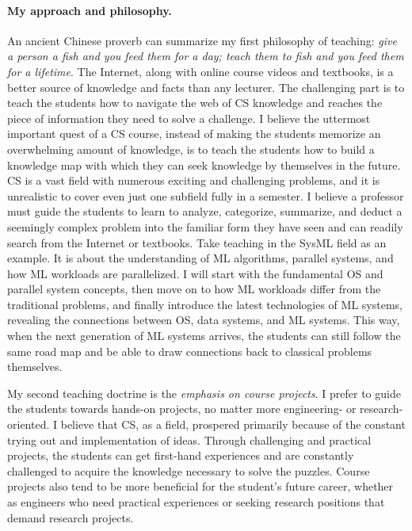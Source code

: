 \documentclass[letterpaper]{article}
\begin{document}
\paragraph{My approach and philosophy.} An ancient Chinese proverb can summarize my first philosophy of teaching: \textit{give a person a fish and you feed them for a day; teach them to fish and you feed them for a lifetime}. The Internet, along with online course videos and textbooks, is a better source of knowledge and facts than any lecturer. The challenging part is to teach the students how to navigate the web of CS knowledge and reaches the piece of information they need to solve a challenge. I believe the uttermost important quest of a CS course, instead of making the students memorize an overwhelming amount of knowledge, is to teach the students how to build a knowledge map with which they can seek knowledge by themselves in the future. CS is a vast field with numerous exciting and challenging problems, and it is unrealistic to cover even just one subfield fully in a semester. I believe a professor must guide the students to learn to analyze, categorize, summarize, and deduct a seemingly complex problem into the familiar form they have seen and can readily search from the Internet or textbooks. Take teaching in the SysML field as an example. It is about the understanding of ML algorithms, parallel systems, and how ML workloads are parallelized. I will start with the fundamental OS and parallel system concepts, then move on to how ML workloads differ from the traditional problems, and finally introduce the latest technologies of ML systems, revealing the connections between OS, data systems, and ML systems. This way, when the next generation of ML systems arrives, the students can still follow the same road map and be able to draw connections back to classical problems themselves. 

My second teaching doctrine is the \textit{emphasis on course projects}. I prefer to guide the students towards hands-on projects, no matter more engineering- or research-oriented. I believe that CS, as a field, prospered primarily because of the constant trying out and implementation of ideas. Through challenging and practical projects, the students can get first-hand experiences and are constantly challenged to acquire the knowledge necessary to solve the puzzles. Course projects also tend to be more beneficial for the student's future career, whether as engineers who need practical experiences or seeking research positions that demand research projects.
\end{document}
